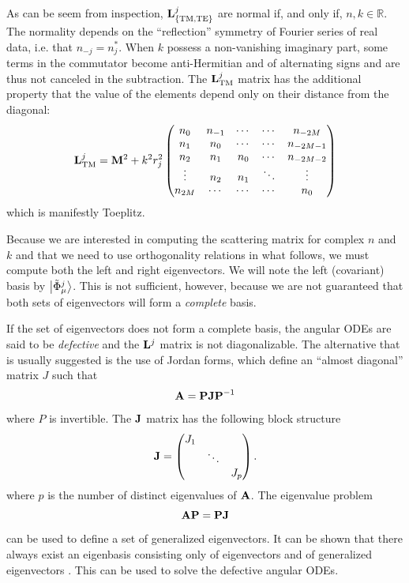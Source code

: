 As can be seem from inspection, $\mathbf{L}^j_\text{\{TM,TE\}}$ are normal 
if, and only if, $n,k\in\mathbb{R}$. The normality depends on the
``reflection'' symmetry of Fourier series of real data, i.e. that 
$n_{-j}=n_j^*$. When $k$ possess a non-vanishing imaginary part, 
some terms in the commutator become anti-Hermitian and of 
alternating signs and are thus not canceled in the subtraction. 
The $\mathbf{L}^j_\text{TM}$ matrix has the additional property that 
the value of the elements depend only on their distance from the diagonal:
  \begin{equation}
   \mathbf{L}^j_\text{TM} = \mathbf{M}^2 +k^2r_j^2\begin{pmatrix} 
		  n_0 & n_{-1} & \cdots & \cdots & n_{-2M}	\\
		  n_1	  & n_0& \cdots & \cdots & n_{-2M-1}\\
		  n_2	  & n_1	   & n_0& \cdots & n_{-2M-2}\\
		  \vdots  & n_2    & n_1    & \ddots & \vdots   \\
		  n_{2M}  & \cdots & \cdots & \cdots & n_0
		\end{pmatrix}
  \end{equation}
which is manifestly Toeplitz.

Because we are interested in computing the scattering matrix for 
complex $n$ and $k$ and that we 
need to use orthogonality relations in what follows, we must
compute both the left and right eigenvectors. 
We will note the left (covariant) basis by $\Ket{\tilde{\Phi}_\mu^j}$.
This is not sufficient, however, because we are not guaranteed that
both sets of eigenvectors will form a \textit{complete} basis. 

If the set of eigenvectors does not form a complete basis, the
angular ODEs are said to be \textit{defective} and the $\mathbf{L}^j$ matrix is not diagonalizable.
The alternative that is usually suggested is the use of Jordan forms, which
define an ``almost diagonal'' matrix $J$ such that
	\begin{equation}
		\mathbf{A} = \mathbf{PJP}^{-1}
	\end{equation}
where $P$ is invertible. The $\mathbf{J}$ matrix has the following block structure
	\begin{equation}
		\mathbf{J} = \begin{pmatrix} J_1 & & \\ & \ddots & \\ & & J_p\end{pmatrix}.
	\end{equation}
where $p$ is the number of distinct eigenvalues of $\mathbf{A}$. The eigenvalue
problem 
	\begin{equation}
		\mathbf{AP} = \mathbf{PJ}
	\end{equation}
can be used to define a set of generalized eigenvectors. It can be shown 
that there always exist an eigenbasis consisting only of eigenvectors 
and of generalized eigenvectors \cite{MEY2001}. This can be used to 
solve the defective angular ODEs.

